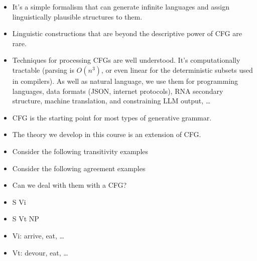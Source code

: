 \documentclass[a4paper,landscape,headrule,footrule]{foils}
\begin{document}

\begin{itemize}
\item It’s a simple formalism that can generate
infinite languages and assign linguistically
plausible structures to them.

\item Linguistic constructions that are beyond the
descriptive power of CFG are rare.

\item Techniques for processing CFGs are well understood.  It's
  computationally tractable (parsing is $O(n^3)$, or even linear for
  the deterministic subsets used in compilers). As well as natural
  language, we use them for programming languages, data formats (JSON,
  internet protocols), RNA secondary structure, machine translation,
  and constraining LLM output, \ldots
\end{itemize}


\begin{itemize}
\item CFG is the starting point for most
types of generative grammar.

\item The theory we develop in this course is an
extension of CFG.
\end{itemize}


\begin{itemize}
\item Consider the following transitivity examples
  \begin{exe}
    \ex {}
    \ex {}
    \ex *
    \ex *
  \end{exe}
\item Consider the following agreement examples
  \begin{exe}
    \ex {}
    \ex {}
    \ex *
    \ex *
  \end{exe}
\item Can we deal with them with a CFG?
\end{itemize}


\begin{itemize}
\item S \into Vi 
\item S \into Vt NP
\item Vi: arrive, eat, \ldots
\item Vt: devour, eat, \ldots
\end{itemize}
\end{document}
